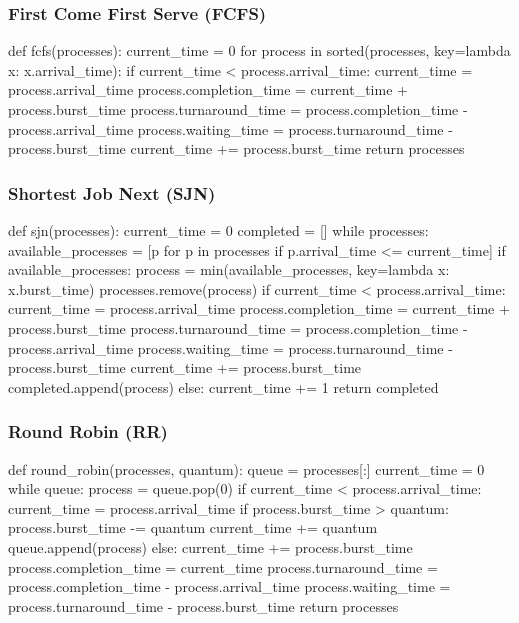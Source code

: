 \documentclass[12pt]{article}
\begin{document}
\begin{itemiz;[e}
\subsubsection{First Come First Serve (FCFS)}
\begin{python}
def fcfs(processes):
    current_time = 0
    for process in sorted(processes, key=lambda x: x.arrival_time):
        if current_time < process.arrival_time:
            current_time = process.arrival_time
        process.completion_time = current_time + process.burst_time
        process.turnaround_time = process.completion_time - process.arrival_time
        process.waiting_time = process.turnaround_time - process.burst_time
        current_time += process.burst_time
    return processes
\end{python}

\subsubsection{Shortest Job Next (SJN)}
\begin{python}
def sjn(processes):
    current_time = 0
    completed = []
    while processes:
        available_processes = [p for p in processes if p.arrival_time <= current_time]
        if available_processes:
            process = min(available_processes, key=lambda x: x.burst_time)
            processes.remove(process)
            if current_time < process.arrival_time:
                current_time = process.arrival_time
            process.completion_time = current_time + process.burst_time
            process.turnaround_time = process.completion_time - process.arrival_time
            process.waiting_time = process.turnaround_time - process.burst_time
            current_time += process.burst_time
            completed.append(process)
        else:
            current_time += 1
    return completed
\end{python}

\subsubsection{Round Robin (RR)}
\begin{python}
def round_robin(processes, quantum):
    queue = processes[:]
    current_time = 0
    while queue:
        process = queue.pop(0)
        if current_time < process.arrival_time:
            current_time = process.arrival_time
        if process.burst_time > quantum:
            process.burst_time -= quantum
            current_time += quantum
            queue.append(process)
        else:
            current_time += process.burst_time
            process.completion_time = current_time
            process.turnaround_time = process.completion_time - process.arrival_time
            process.waiting_time = process.turnaround_time - process.burst_time
    return processes
\end{python}


\end{itemiz;[e}
\end{document}
